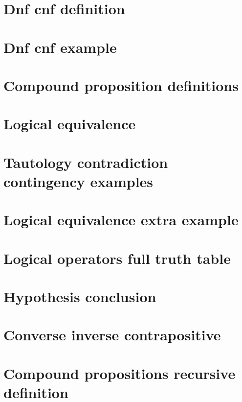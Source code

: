 \section*{Dnf cnf definition}

\vfill
\section*{Dnf cnf example}

\vfill
\section*{Compound proposition definitions}

\vfill
\section*{Logical equivalence}

\vfill
\section*{Tautology contradiction contingency examples}

\vfill
\section*{Logical equivalence extra example}

\vfill
\section*{Logical operators full truth table}

\vfill
\section*{Hypothesis conclusion}

\vfill
\section*{Converse inverse contrapositive}

\vfill
\section*{Compound propositions recursive definition}

\vfill
